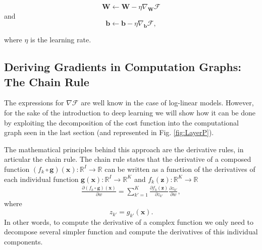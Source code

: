 \begin{equation}
\mathbf{W} \leftarrow \mathbf{W} - \eta \nabla_\mathbf{W}\mathcal{F}
\end{equation}
and
\begin{equation}
\mathbf{b} \leftarrow \mathbf{b} - \eta \nabla_\mathbf{b}\mathcal{F},
\end{equation}

\noindent where $\eta$ is the learning rate.



\subsection{Deriving Gradients in Computation Graphs: The Chain Rule}

The expressions for $\nabla\mathcal{F}$ are well know in the case of log-linear models. However, for
the sake of the introduction to deep learning we will show how it can
be done by exploiting the decomposition of the cost function into the computational
graph seen in the last section (and represented in Fig. \ref{fig:LayerP}).  

The mathematical principles behind this approach are the derivative rules, in articular the chain rule. 
The chain rule states that the derivative of a composed function $({f_k} \circ \mathbf{g})(\mathbf{x}) : \mathbb{R}^{I} \rightarrow \mathbb{R}$ can be written as a function of the derivatives of each individual function  $\mathbf{g}(\mathbf{x}): \mathbb{R}^{I} \rightarrow \mathbb{R}^{K}$ and ${f_k(\mathbf{z})}: \mathbb{R}^{K} \rightarrow \mathbb{R}$
%
\begin{align}
\frac{\partial (f_{k} \circ \mathbf{g})(\mathbf{x}) }{\partial w} = \sum_{k'=1}^{K}\frac{\partial f_{k}(\mathbf{z})}{\partial z_{k'}}\frac{\partial z_{k'}}{\partial w},
\label{eq:chainRule}
\end{align}
%
where 
%
\begin{equation}
z_{k'} = g_{k'}(\mathbf{x}).
\end{equation}
%
In other words, to compute the derivative of a complex function we only need
to decompose several simpler function and compute the derivatives of this individual
components. 


